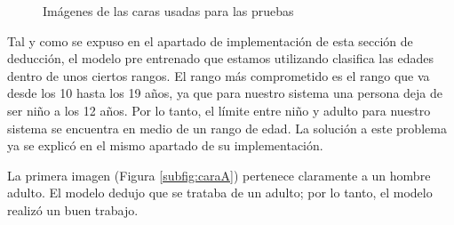 \begin{figure}
{\begin{subfigure}
        \label{subfig:caraD}
    \end{subfigure}
    }
    \hfill
\caption{Imágenes de las caras usadas para las pruebas}
\label{fig:img_prueba_caras}
\end{figure}


Tal y como se expuso en el apartado de implementación de esta sección de deducción, el modelo pre entrenado que estamos utilizando clasifica las edades dentro de unos ciertos rangos. El rango más comprometido es el rango que va desde los 10 hasta los 19 años, ya que para nuestro sistema una persona deja de ser niño a los 12 años. Por lo tanto, el límite entre niño y adulto para nuestro sistema se encuentra en medio de un rango de edad. La solución a este problema ya se explicó en el mismo apartado de su implementación.

La primera imagen (Figura \ref{subfig:caraA}) pertenece claramente a un hombre adulto. El modelo dedujo que se trataba de un adulto; por lo tanto, el modelo realizó un buen trabajo.

